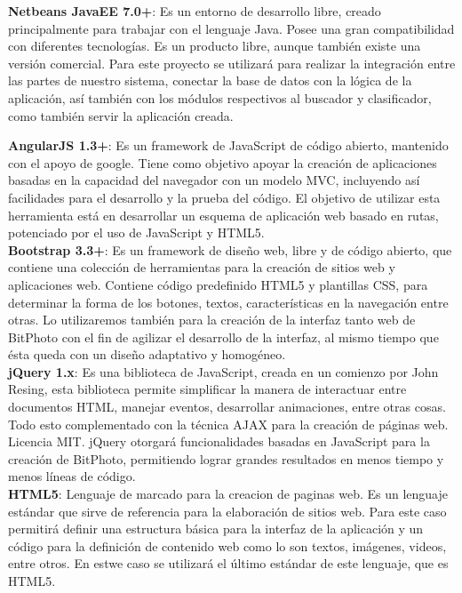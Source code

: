 \documentclass{memoria}
\begin{document}
\textbf{Netbeans JavaEE 7.0+}: Es un entorno de desarrollo libre, creado principalmente para trabajar con el lenguaje Java. Posee una gran compatibilidad con diferentes tecnologías. Es un producto libre, aunque también existe una versión comercial. Para este proyecto se utilizará para realizar la integración entre las partes de nuestro sistema, conectar la base de datos con la lógica de la aplicación, así también con los módulos respectivos al buscador y clasificador, como también servir la aplicación creada.\\


\textbf{AngularJS 1.3+}: Es un framework de JavaScript de código abierto, mantenido con el apoyo de google. Tiene como objetivo apoyar la creación de aplicaciones basadas en la capacidad del navegador con un modelo MVC, incluyendo así facilidades para el desarrollo y la prueba del código. El objetivo de utilizar esta herramienta está en desarrollar un esquema de aplicación web basado en rutas, potenciado por el uso de JavaScript y HTML5.\\

\textbf{Bootstrap 3.3+}: Es un framework de diseño web, libre y de código abierto, que contiene una colección de herramientas para la creación de sitios web y aplicaciones web. Contiene código predefinido HTML5 y plantillas CSS, para determinar la forma de los botones, textos, características en la navegación entre otras. Lo utilizaremos también para la creación de la interfaz tanto web de BitPhoto con el fin de agilizar el desarrollo de la interfaz, al mismo tiempo que ésta queda con un diseño adaptativo y homogéneo.\\

\textbf{jQuery 1.x}: Es una biblioteca de JavaScript, creada en un comienzo por John Resing, esta biblioteca permite simplificar la manera de interactuar entre documentos HTML, manejar eventos, desarrollar animaciones, entre otras cosas. Todo esto complementado con la técnica AJAX para la creación de páginas web. Licencia MIT. jQuery otorgará funcionalidades basadas en JavaScript para la creación de BitPhoto, permitiendo lograr grandes resultados en menos tiempo y menos líneas de código.\\

\textbf{HTML5}: Lenguaje de marcado para la creacion de paginas web. Es un lenguaje estándar que sirve de referencia para la elaboración de sitios web. Para este caso permitirá definir una estructura básica para la interfaz de la aplicación y un código para la definición de contenido web como lo son textos, imágenes, videos, entre otros. En estwe caso se utilizará el último estándar de este lenguaje, que es HTML5.\\
\end{document}
